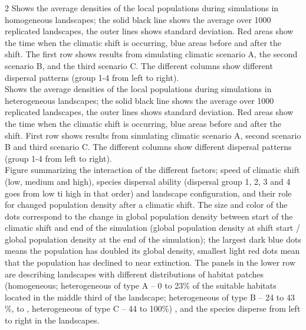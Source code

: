 \documentclass[12pt,pdftex]{article}
\begin{document}
\begin{spacing}{2}
 Shows the average densities of the local populations during simulations in homogeneous landscapes; the solid black line shows the average over 1000 replicated landscapes, the outer lines shows standard deviation. Red areas show the time when the climatic shift is occurring, blue areas before and after the shift. The first row shows results from simulating climatic scenario A, the second scenario B, and the third scenario C. The different columns show different dispersal patterns (group 1-4 from left to right).\\

 Shows the average densities of the local populations during simulations in heterogeneous landscapes; the solid black line shows the average over 1000 replicated landscapes, the outer lines shows standard deviation. Red areas show the time when the climatic shift is occurring, blue areas before and after the shift. First row shows results from simulating climatic scenario A, second scenario B and third scenario C. The different columns show different dispersal patterns (group 1-4 from left to right).\\

 Figure summarizing the interaction of the different factors; speed of climatic shift (low, medium and high),  species dispersal ability (dispersal group 1, 2, 3 and 4 goes from low ti high in that order) and landscape configuration, and their role for changed population density after a climatic shift. The size and color of the dots correspond to the change in global population density between start of the climatic shift and end of the simulation (global population density at shift start / global population density at the end of the simulation); the largest dark blue dots means the population has doubled its global density, smallest light red dots mean that the population has declined to near extinction. The panels in the lower row are describing landscapes with different distributions of habitat patches (homogeneous; heterogeneous of type A -- 0 to 23\% of the suitable habitats located in the middle third of the landscape; heterogeneous of type B -- 24 to 43 \%,  to , heterogeneous of type C --  44 to 100\%) , and the species disperse from left to right in the landscapes.\\ 


\end{spacing}
\end{document}
